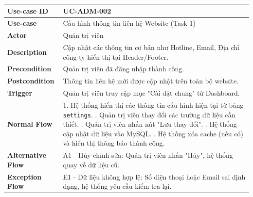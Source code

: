 \begin{table}[H]
\centering
\renewcommand{\arraystretch}{1.2}
\begin{tabular}{|p{3.5cm}|p{9.5cm}|}
\hline
\textbf{Use-case ID} & UC-ADM-002 \\ \hline
\textbf{Use-case} & Cấu hình thông tin liên hệ Website (Task 1) \\ \hline
\textbf{Actor} & Quản trị viên \\ \hline
\textbf{Description} & Cập nhật các thông tin cơ bản như Hotline, Email, Địa chỉ công ty hiển thị tại Header/Footer. \\ \hline
\textbf{Precondition} & Quản trị viên đã đăng nhập thành công. \\ \hline
\textbf{Postcondition} & Thông tin liên hệ mới được cập nhật trên toàn bộ website. \\ \hline
\textbf{Trigger} & Quản trị viên truy cập mục "Cài đặt chung" từ Dashboard. \\ \hline
\textbf{Normal Flow} & 
1. Hệ thống hiển thị các thông tin cấu hình hiện tại từ bảng \texttt{settings}. \newline
2. Quản trị viên thay đổi các trường dữ liệu cần thiết. \newline
3. Quản trị viên nhấn nút "Lưu thay đổi". \newline
4. Hệ thống cập nhật dữ liệu vào MySQL. \newline
5. Hệ thống xóa cache (nếu có) và hiển thị thông báo thành công. \\ \hline
\textbf{Alternative Flow} & A1 - Hủy chỉnh sửa: Quản trị viên nhấn "Hủy", hệ thống quay về dữ liệu cũ. \\ \hline
\textbf{Exception Flow} & E1 - Dữ liệu không hợp lệ: Số điện thoại hoặc Email sai định dạng, hệ thống yêu cầu kiểm tra lại. \\ \hline
\end{tabular}
\end{table}

